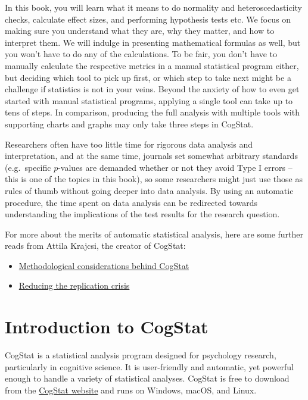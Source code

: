 \documentclass[
  11pt,
]{book}
\providecommand{\tightlist}{%
  \setlength{\itemsep}{0pt}\setlength{\parskip}{0pt}}
\theoremstyle{indenteddefinition}
\theoremstyle{indenteddefinition}
\theoremstyle{definition}
\theoremstyle{definition}
\theoremstyle{remark}
\begin{document}
In this book, you will learn what it means to do normality and heteroscedasticity checks, calculate effect sizes, and performing hypothesis tests etc. We focus on making sure you understand what they are, why they matter, and how to interpret them. We will indulge in presenting mathematical formulas as well, but you won't have to do any of the calculations. To be fair, you don't have to manually calculate the respective metrics in a manual statistical program either, but deciding which tool to pick up first, or which step to take next might be a challenge if statistics is not in your veins. Beyond the anxiety of how to even get started with manual statistical programs, applying a single tool can take up to tens of steps. In comparison, producing the full analysis with multiple tools with supporting charts and graphs may only take three steps in CogStat.

Researchers often have too little time for rigorous data analysis and interpretation, and at the same time, journals set somewhat arbitrary standards (e.g.~specific \(p\)-values are demanded whether or not they avoid Type I errors -- this is one of the topics in this book), so some researchers might just use those as rules of thumb without going deeper into data analysis. By using an automatic procedure, the time spent on data analysis can be redirected towards understanding the implications of the test results for the research question.

For more about the merits of automatic statistical analysis, here are some further reads from Attila Krajcsi, the creator of CogStat:

\begin{itemize}
\tightlist
\item
  \href{https://psyarxiv.com/hnmsq}{Methodological considerations behind CogStat}
\item
  \href{https://docs.google.com/presentation/d/1HmSTPnTxDzW8hYZG7ujHaeHc0mRqqYeY95yKh56z61c}{Reducing the replication crisis}
\end{itemize}

\hypertarget{cogstatintro}{%
\chapter{Introduction to CogStat}\label{cogstatintro}}

CogStat is a statistical analysis program designed for psychology research, particularly in cognitive science. It is user-friendly and automatic, yet powerful enough to handle a variety of statistical analyses. CogStat is free to download from the \href{http://cogstat.org}{CogStat website} and runs on Windows, macOS, and Linux.
\end{document}
